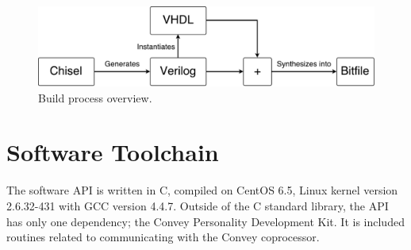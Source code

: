 \begin{figure}[ht]
  \centering
  \includegraphics[width=0.8\linewidth]{fig/hardware-build-process}
  \caption{Build process overview.\label{fig:hw-build-process} }
\end{figure}

\section{Software Toolchain}

The software API is written in C, compiled on CentOS 6.5, Linux kernel version
2.6.32-431 with GCC version 4.4.7. Outside of the C standard library, the API
has only one dependency; the Convey Personality Development Kit. It is included
routines related to communicating with the Convey coprocessor.


\cleardoublepage
